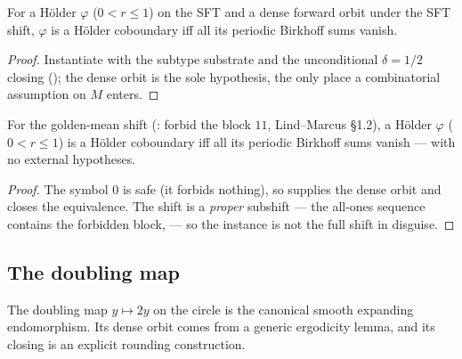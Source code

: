 \begin{theorem}\label{thm:livsic-sft}
  \leanok
  For a Hölder \(\varphi\) (\(0 < r\le 1\)) on the SFT and a dense forward orbit under the SFT shift,
  \(\varphi\) is a Hölder coboundary iff all its periodic Birkhoff sums vanish.
\end{theorem}
\begin{proof}\leanok
  Instantiate  with the subtype substrate and the unconditional
  \(\delta = 1/2\) closing (); the dense orbit is the sole hypothesis,
  the only place a combinatorial assumption on \(M\) enters.
\end{proof}

\begin{theorem}\label{thm:livsic-goldenmean}
  \leanok
  For the golden-mean shift (: forbid the block \(11\), Lind--Marcus
  \S1.2), a Hölder \(\varphi\) (\(0 < r\le 1\)) is a Hölder coboundary iff all its periodic Birkhoff
  sums vanish --- with no external hypotheses.
\end{theorem}
\begin{proof}\leanok
  The symbol \(0\) is safe (it forbids nothing), so  supplies the dense
  orbit and  closes the equivalence. The shift is a \emph{proper} subshift ---
  the all-ones sequence contains the forbidden block,  --- so
  the instance is not the full shift in disguise.
\end{proof}

\subsection{The doubling map}

The doubling map \(y\mapsto 2y\) on the circle is the canonical smooth expanding endomorphism. Its
dense orbit comes from a generic ergodicity lemma, and its closing is an explicit rounding
construction.

